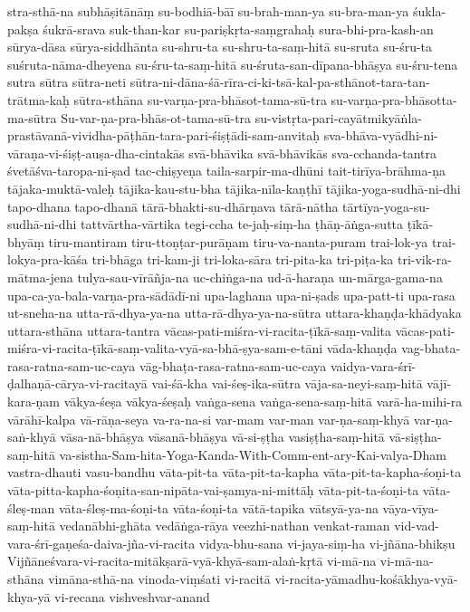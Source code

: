 {stra-sthā-na
subhāṣitānāṃ
su-bodhiā-bāī
su-brah-man-ya
su-bra-man-ya
śukla-pakṣa
śukrā-srava
suk-than-kar
su-pariṣkṛta-saṃgrahaḥ
sura-bhi-pra-kash-an
sūrya-dāsa
sūrya-siddhānta
su-shru-ta
su-shru-ta-saṃ-hitā
su-sruta
su-śru-ta
suśruta-nāma-dheyena
su-śru-ta-saṃ-hitā
su-śruta-san-dīpana-bhāṣya
su-śru-tena
sutra
sūtra
sūtra-neti
sūtra-ni-dāna-śā-rīra-ci-ki-tsā-kal-pa-sthānot-tara-tan-trātma-kaḥ
sūtra-sthāna
su-varṇa-pra-bhāsot-tama-sū-tra
su-varṇa-pra-bhāsotta-ma-sūtra
Su-var-ṇa-pra-bhās-ot-tama-sū-tra
su-vistṛta-pari-cayātmikyāṅla-prastāvanā-vividha-pāṭhān-tara-pari-śiṣṭādi-sam-anvitaḥ
sva-bhāva-vyādhi-ni-vāraṇa-vi-śiṣṭ-auṣa-dha-cintakās
svā-bhāvika
svā-bhāvikās
sva-cchanda-tantra
śvetāśva-taropa-ni-ṣad
tac-chiṣyeṇa
taila-sarpir-ma-dhūni
tait-tirīya-brāhma-ṇa
tājaka-muktā-valeḥ
tājika-kau-stu-bha
tājika-nīla-kaṇṭhī
tājika-yoga-sudhā-ni-dhi
tapo-dhana
tapo-dhanā
tārā-bhakti-su-dhārṇava
tārā-nātha
tārtīya-yoga-su-sudhā-ni-dhi
tattvārtha-vārtika
tegi-ccha
te-jaḥ-siṃ-ha
ṭhāṇ-āṅga-sutta
ṭīkā-bhyāṃ
tiru-mantiram
tiru-ttoṇṭar-purāṇam
tiru-va-nanta-puram
trai-lok-ya
trai-lokya-pra-kāśa
tri-bhāga
tri-kam-ji
tri-loka-sāra
tri-pita-ka
tri-piṭa-ka
tri-vik-ra-mātma-jena
tulya-sau-vīrāñja-na
uc-chiṅga-na
ud-ā-haraṇa
un-mārga-gama-na
upa-ca-ya-bala-varṇa-pra-sādādī-ni
upa-laghana
upa-ni-ṣads
upa-patt-ti
upa-rasa
ut-sneha-na
utta-rā-dhya-ya-na
utta-rā-dhya-ya-na-sūtra
uttara-khaṇḍa-khādyaka
uttara-sthāna
uttara-tantra
vācas-pati-miśra-vi-racita-ṭīkā-saṃ-valita
vācas-pati-miśra-vi-racita-ṭīkā-saṃ-valita-vyā-sa-bhā-ṣya-sam-e-tāni
vāda-khaṇḍa
vag-bhata-rasa-ratna-sam-uc-caya
vāg-bhaṭa-rasa-ratna-sam-uc-caya
vaidya-vara-śrī-ḍalhaṇā-cārya-vi-racitayā
vai-śā-kha
vai-śeṣ-ika-sūtra
vāja-sa-neyi-saṃ-hitā
vājī-kara-ṇam
vākya-śeṣa
vākya-śeṣaḥ
vaṅga-sena
vaṅga-sena-saṃ-hitā
varā-ha-mihi-ra
vārāhī-kalpa
vā-rāṇa-seya
va-ra-na-si
var-mam
var-man
var-ṇa-saṃ-khyā
var-ṇa-saṅ-khyā
vāsa-nā-bhāṣya
vāsanā-bhāṣya
vā-si-ṣṭha
vasiṣṭha-saṃ-hitā
vā-siṣṭha-saṃ-hitā
va-sistha-Sam-hita-Yoga-Kanda-With-Comm-ent-ary-Kai-valya-Dham
vastra-dhauti
vasu-bandhu
vāta-pit-ta
vāta-pit-ta-kapha
vāta-pit-ta-kapha-śoṇi-ta
vāta-pitta-kapha-śoṇita-san-nipāta-vai-ṣamya-ni-mittāḥ
vāta-pit-ta-śoṇi-ta
vāta-śleṣ-man
vāta-śleṣ-ma-śoṇi-ta
vāta-śoṇi-ta
vātā-tapika
vātsyā-ya-na
vāya-vīya-saṃ-hitā
vedanābhi-ghāta
vedāṅga-rāya
veezhi-nathan
venkat-raman
vid-vad-vara-śrī-gaṇeśa-daiva-jña-vi-racita
vidya-bhu-sana
vi-jaya-siṃ-ha
vi-jñāna-bhikṣu
Vijñāneśvara-vi-racita-mitākṣarā-vyā-khyā-sam-alaṅ-kṛtā
vi-mā-na
vi-mā-na-sthāna
vimāna-sthā-na
vinoda-viṃśati
vi-racitā
vi-racita-yāmadhu-kośākhya-vyā-khya-yā
vi-recana
vishveshvar-anand
}
